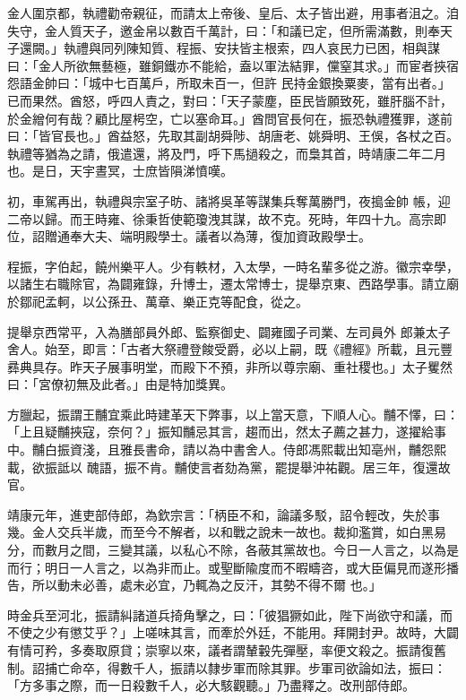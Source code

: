 \begin{pinyinscope}
 金人圍京都，執禮勸帝親征，而請太上帝後、皇后、太子皆出避，用事者沮之。洎失守，金人質天子，邀金帛以數百千萬計，曰：「和議已定，但所需滿數，則奉天子還闕。」執禮與同列陳知質、程振、安扶皆主根索，四人哀民力已困，相與謀曰：「金人所欲無藝極，雖銅鐵亦不能給，盍以軍法結罪，儻窒其求。」而宦者挾宿怨語金帥曰：「城中七百萬戶，所取未百一，但許
 民持金銀換粟麥，當有出者。」已而果然。酋怒，呼四人責之，對曰：「天子蒙塵，臣民皆願致死，雖肝腦不計，於金繒何有哉？顧比屋枵空，亡以塞命耳。」酋問官長何在，振恐執禮獲罪，遂前曰：「皆官長也。」酋益怒，先取其副胡舜陟、胡唐老、姚舜明、王俁，各杖之百。執禮等猶為之請，俄遣還，將及門，呼下馬撾殺之，而梟其首，時靖康二年二月也。是日，天宇晝冥，士庶皆隕涕憤嘆。



 初，車駕再出，執禮與宗室子昉、諸將吳革等謀集兵奪萬勝門，夜搗金帥
 帳，迎二帝以歸。而王時雍、徐秉哲使範瓊洩其謀，故不克。死時，年四十九。高宗即位，詔贈通奉大夫、端明殿學士。議者以為薄，復加資政殿學士。



 程振，字伯起，饒州樂平人。少有軼材，入太學，一時名輩多從之游。徽宗幸學，以諸生右職除官，為闢雍錄，升博士，遷太常博士，提舉京東、西路學事。請立廟於鄒祀孟軻，以公孫丑、萬章、樂正克等配食，從之。



 提舉京西常平，入為膳部員外郎、監察御史、闢雍國子司業、左司員外
 郎兼太子舍人。始至，即言：「古者大祭禮登餕受爵，必以上嗣，既《禮經》所載，且元豐彞典具存。昨天子展事明堂，而殿下不預，非所以尊宗廟、重社稷也。」太子矍然曰：「宮僚初無及此者。」由是特加獎異。



 方臘起，振謂王黼宜乘此時建革天下弊事，以上當天意，下順人心。黼不懌，曰：「上且疑黼挾寇，奈何？」振知黼忌其言，趨而出，然太子薦之甚力，遂擢給事中。黼白振資淺，且雅長書命，請以為中書舍人。侍郎馮熙載出知亳州，黼怨熙載，欲振詆以
 醜語，振不肯。黼使言者劾為黨，罷提舉沖祐觀。居三年，復還故官。



 靖康元年，進吏部侍郎，為欽宗言：「柄臣不和，論議多駁，詔令輕改，失於事幾。金人交兵半歲，而至今不解者，以和戰之說未一故也。裁抑濫賞，如白黑易分，而數月之間，三變其議，以私心不除，各蔽其黨故也。今日一人言之，以為是而行；明日一人言之，以為非而止。或聖斷隃度而不暇疇咨，或大臣偏見而遂形播告，所以動未必善，處未必宜，乃輒為之反汗，其勢不得不爾
 也。」



 時金兵至河北，振請糾諸道兵掎角擊之，曰：「彼猖獗如此，陛下尚欲守和議，而不使之少有懲艾乎？」上嗟味其言，而牽於外廷，不能用。拜開封尹。故時，大闢有情可矜，多奏取原貸；崇寧以來，議者謂輦轂先彈壓，率便文殺之。振請復舊制。詔捕亡命卒，得數千人，振請以隸步軍而除其罪。步軍司欲論如法，振曰：「方多事之際，而一日殺數千人，必大駭觀聽。」乃盡釋之。改刑部侍郎。




\end{pinyinscope}
